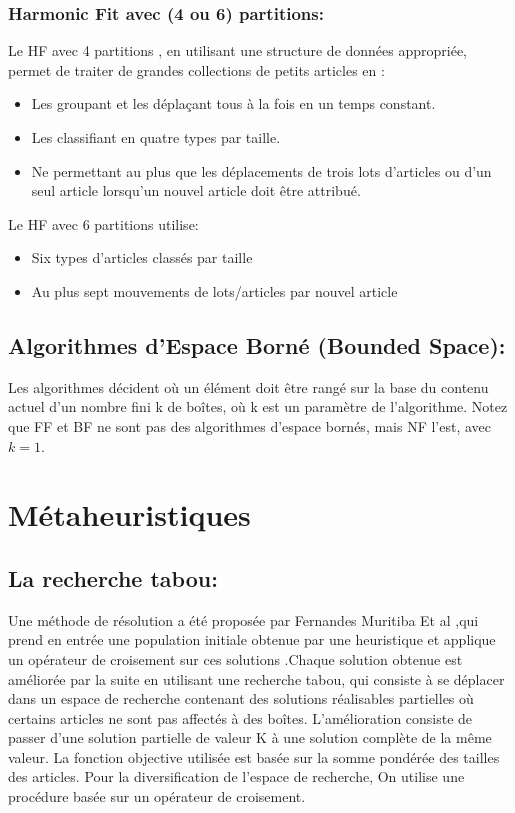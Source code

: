 \documentclass[class=report, crop=false]{standalone}
\begin{document}
        \subsubsection{Harmonic Fit avec (4 ou 6) partitions: }
        Le HF avec 4 partitions \cite{man1996approximation}, en utilisant une structure de données appropriée, permet de traiter de grandes collections de petits articles en :
        \renewcommand{\labelitemi}{$\circ$}  
        \begin{itemize}
            \item Les groupant et les déplaçant tous à la fois en un temps constant.
            \item Les classifiant en quatre types par taille.
            \item Ne permettant au plus que les déplacements de trois lots d’articles ou d'un seul article lorsqu'un nouvel article doit être attribué.
        \end{itemize}
        Le HF avec 6 partitions \cite{man1996approximation} utilise:
        \renewcommand{\labelitemi}{$\circ$}  
        \begin{itemize}
            \item Six types d'articles classés par taille
            \item Au plus sept mouvements de lots/articles par nouvel article
        \end{itemize}
        \subsection{Algorithmes d’Espace Borné (Bounded Space):}
        Les algorithmes décident où un élément doit être rangé sur la base du contenu actuel d'un nombre fini k de boîtes, où k est un paramètre de l'algorithme. Notez que FF et BF ne sont pas des algorithmes d'espace bornés, mais NF l'est, avec \(k = 1\).
        \section{Métaheuristiques}
        \subsection{La recherche tabou: }
        Une méthode de résolution a été proposée par Fernandes Muritiba Et al \cite{mannai2018guided} ,qui prend en entrée une population initiale obtenue par une heuristique et applique un opérateur de croisement sur ces solutions .Chaque solution obtenue est améliorée par la suite en utilisant une recherche tabou, qui consiste à  se déplacer dans un espace de recherche contenant des solutions réalisables  partielles où certains articles ne sont pas affectés à des boîtes. L’amélioration consiste de passer d’une solution partielle de valeur K à une solution complète de la même valeur. La fonction objective utilisée est basée sur la somme pondérée des tailles des articles.
Pour la diversification de l’espace de recherche, On utilise une procédure basée sur un opérateur de croisement.
\end{document}
